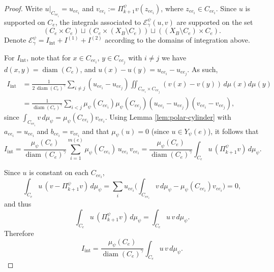 \documentclass[12pt]{amsart}
\theoremstyle{plain}
\theoremstyle{definition}
\begin{document}
\begin{proof}
Write $u|_{C_{ee_i}}=u_{ee_i}$ and $v_{ee_i}:=\Pi^\psi_{k+1}v(z_{ee_i})$, where $z_{ee_i}\in C_{ee_i}$. Since $u$ is supported on $C_e$, the integrals associated to $\mathcal{E}^\psi_\gamma (u,v)$ are supported on the set 
$$(C_e\times C_e)\sqcup (C_e\times(X_B\setminus C_e) ) \sqcup ((X_B\setminus C_e)\times C_e).$$
Denote $\mathcal{E}^\psi_\gamma  = I_{\mathrm{int}}+I^{(1)}+I^{(2)}$ according to the domains of integration above.

For $I_{\mathrm{int}}$, note that for $x\in C_{ee_i}$, $y\in C_{ee_j}$ with $i\neq j$ we have $d(x,y)=\operatorname{diam}(C_e)$,
and $u(x)-u(y)=u_{ee_i}-u_{ee_j}$. As such,
\begin{align*}
I_{\mathrm{int}}
&=\frac{1}{2\,\operatorname{diam}(C_e)^\gamma}
\sum_{i\neq j}(u_{ee_i}-u_{ee_j})\!\!\iint_{C_{ee_i}\times C_{ee_j}}\!\!(v(x)-v(y))\,d\mu(x)d\mu(y) \\
&=\frac{1}{\operatorname{diam}(C_e)^\gamma}\sum_{i<j}\mu_\psi(C_{ee_i})\mu_\psi(C_{ee_j})(u_{ee_i}-u_{ee_j})(v_{ee_i}-v_{ee_j}),
\end{align*}
since $\int_{C_{ee_i}}v\,d\mu_\psi=\mu_\psi(C_{ee_i})v_{ee_i}$. Using Lemma \ref{lem:polar-cylinder} with
$a_{ee_i}=u_{ee_i}$ and $b_{ee_i}=v_{ee_i}$ and that $\mu_\psi(u)=0$ (since $u\in Y_\psi(e)$), it follows that
\[
I_{\mathrm{int}}
=\frac{\mu_\psi(C_e)}{\operatorname{diam}(C_e)^\gamma}\sum_{i=1}^{m(e)} \mu_\psi(C_{ee_i})\,u_{ee_i}\,v_{ee_i}
=\frac{\mu_\psi(C_e)}{\operatorname{diam}(C_e)^\gamma}\int_{C_e} u\,(\Pi^\psi_{k+1}v)\,d\mu_\psi.
\]

Since $u$ is constant on each $C_{ee_i}$,
\[
\int_{C_e} u\,(v-\Pi^\psi_{k+1}v)\,d\mu_\psi
=\sum_i u_{ee_i}\Big(\int_{C_{ee_i}} v\,d\mu_\psi-\mu_\psi(C_{ee_i})v_{ee_i}\Big)=0,
\]
and thus
\begin{equation}\label{eq:replace-v-by-avg}
\int_{C_e} u\,(\Pi^\psi_{k+1}v)\,d\mu_\psi=\int_{C_e} u\,v\,d\mu_\psi.
\end{equation}
Therefore
\[
I_{\mathrm{int}}=\frac{\mu_\psi(C_e)}{\operatorname{diam}(C_e)^\gamma}\int_{C_e} u\,v\,d\mu_\psi.
\]


\end{proof}
\end{document}
